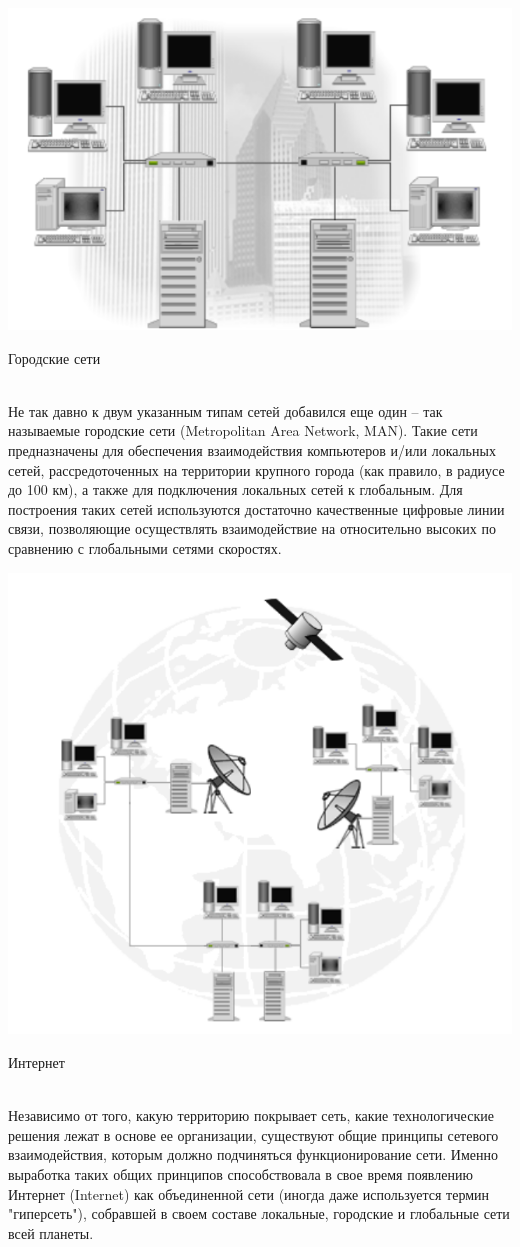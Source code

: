 \documentclass[a4paper,14pt]{extarticle}
\begin{document}
\centering
\includegraphics[width=0.9\linewidth]{n4.png}
\newline
\caption{Городские сети}\\
Не так давно к двум указанным типам сетей добавился еще один – так называемые городские сети (Metropolitan Area Network, MAN). Такие сети предназначены для обеспечения взаимодействия компьютеров и/или локальных сетей, рассредоточенных на территории крупного города (как правило, в радиусе до 100 км), а также для подключения локальных сетей к глобальным. Для построения таких сетей используются достаточно качественные цифровые линии связи, позволяющие осуществлять взаимодействие на относительно высоких по сравнению с глобальными сетями скоростях.


\centering
\includegraphics[width=0.9\linewidth]{n5.png}
\newline
\caption{Интернет}\\
Независимо от того, какую территорию покрывает сеть, какие технологические решения лежат в основе ее организации, существуют общие принципы сетевого взаимодействия, которым должно подчиняться функционирование сети. Именно выработка таких общих принципов способствовала в свое время появлению Интернет (Internet) как объединенной сети (иногда даже используется термин "гиперсеть"), собравшей в своем составе локальные, городские и глобальные сети всей планеты.
\end{document}
